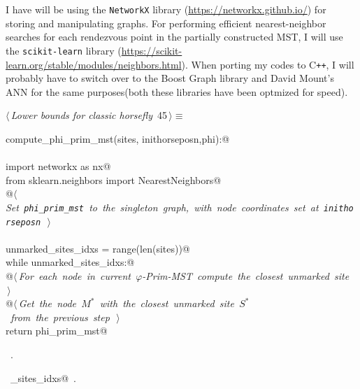 \documentclass[11.5pt]{report}
\begin{document}
I have will be using the \verb|NetworkX| library (\url{https://networkx.github.io/}) for 
storing and manipulating graphs. For performing efficient nearest-neighbor searches for 
each rendezvous point in the partially constructed MST, I will use the \verb|scikit-learn| 
library (\url{https://scikit-learn.org/stable/modules/neighbors.html}). When porting 
my codes to C\texttt{++}, I will probably have to switch over to the Boost Graph library and 
David Mount's ANN for the same purposes(both these libraries have been optmized for speed). 

\begin{flushleft} \small
\begin{minipage}{\linewidth}\label{scrap53}\raggedright\small
{} $\langle\,${\itshape Lower bounds for classic horsefly}\nobreak\ {\footnotesize {45}}$\,\rangle\equiv$
\vspace{-1ex}
\begin{list}{}{} \item
\mbox{}\verb@def compute_phi_prim_mst(sites, inithorseposn,phi):@\\
\mbox{}\verb@@\\
\mbox{}\verb@     import networkx as nx@\\
\mbox{}\verb@     from sklearn.neighbors import NearestNeighbors@\\
\mbox{}\verb@     @\hbox{$\langle\,${\itshape Set \verb|phi_prim_mst| to the singleton graph, with node coordinates set at \verb|inithorseposn|}\nobreak\ {\footnotesize {}}$\,\rangle$}\verb@@\\
\mbox{}\verb@@\\
\mbox{}\verb@     unmarked_sites_idxs = range(len(sites))@\\
\mbox{}\verb@     while unmarked_sites_idxs:@\\
\mbox{}\verb@          @\hbox{$\langle\,${\itshape For each node in current $\varphi$-Prim-MST compute the closest unmarked site}\nobreak\ {\footnotesize {}}$\,\rangle$}\verb@@\\
\mbox{}\verb@          @\hbox{$\langle\,${\itshape Get the node $M^{*}$ with the closest unmarked site $S^{*}$ from the previous step}\nobreak\ {\footnotesize {}}$\,\rangle$}\verb@@\\
\mbox{}\verb@     return phi_prim_mst@\\
\mbox{}\verb@@{\NWsep}
\end{list}
\vspace{-1.5ex}
\footnotesize
\begin{list}{}{\setlength{\itemsep}{-\parsep}\setlength{\itemindent}{-\leftmargin}}
\item \NWtxtMacroRefIn\ .
\item \NWtxtIdentsDefed\nobreak\  \verb@unmarked_sites_idxs@\nobreak\ .
\item{}
\end{list}
\end{minipage}\vspace{4ex}
\end{flushleft}
\end{document}
